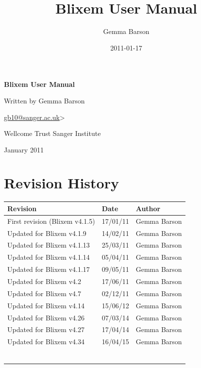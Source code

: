 \documentclass[letterpaper]{article}
\title{Blixem User Manual}
\author{Gemma Barson}
\date{2011-01-17}
\begin{document}
\setcounter{page}{1}\pagestyle{Standard}


\thispagestyle{FirstPage}
{\centering\sffamily\bfseries\color[rgb]{0.0,0.27058825,0.5254902}
\Huge\bf{Blixem User Manual}\par}

\bigskip

{\centering\large{Written by Gemma Barson}\par}
{\centering{\textless}\href{mailto:gb10@sanger.ac.uk}{gb10@sanger.ac.uk}{\textgreater}\par}

\bigskip

{\centering\large{Wellcome Trust Sanger Institute}\par}
{ January 2011\par}



\clearpage
{\color[rgb]{0.0,0.27058825,0.5254902}\section[Revision History]{Revision History}}
\hypertarget{RefHeading334316266717}{}

\begin{center}
\tablehead{}
\begin{supertabular}{|m{8.073cm}|m{3.2849998cm}|m{3.282cm}|}
\hline
\bfseries Revision &
\bfseries Date &
\bfseries Author\\\hline
 First revision (Blixem v4.1.5) &
 17/01/11 &
 Gemma Barson\\\hline
 Updated for Blixem v4.1.9 &
 14/02/11 &
 Gemma Barson\\\hline
 Updated for Blixem v4.1.13 &
 25/03/11 &
 Gemma Barson\\\hline
 Updated for Blixem v4.1.14 &
 05/04/11 &
 Gemma Barson\\\hline
 Updated for Blixem v4.1.17 &
 09/05/11 &
 Gemma Barson\\\hline
 Updated for Blixem v4.2 &
 17/06/11 &
 Gemma Barson\\\hline
 Updated for Blixem v4.7 &
 02/12/11 &
 Gemma Barson\\\hline
 Updated for Blixem v4.14 &
 15/06/12 &
 Gemma Barson\\\hline
 Updated for Blixem v4.26  &
 07/03/14 &
 Gemma Barson\\\hline
 Updated for Blixem v4.27  &
 17/04/14 &
 Gemma Barson\\\hline
 Updated for Blixem v4.34  &
 16/04/15 &
 Gemma Barson\\\hline
 &
 &
 \\\hline
 &
 &
 \\\hline
 &
 &
 \\\hline
 &
 &
 \\\hline
 &
 &
 \\\hline
 &
 &
 \\\hline
\end{supertabular}
\end{center}
\end{document}
